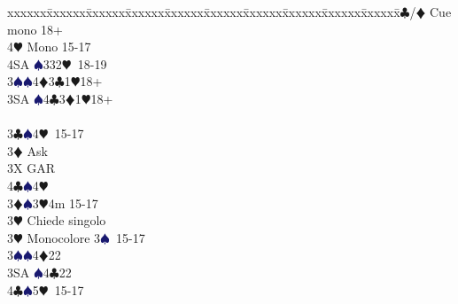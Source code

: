 \documentclass[a4paper,italian]{article}
\newcommand{\BC}{\textcolor{OliveGreen}{$\clubsuit$}}
\newcommand{\BD}{\textcolor{RedOrange}{$\vardiamondsuit$}}
\newcommand{\BH}{\textcolor{Red2}{$\varheartsuit${}}}
\newcommand{\BS}{\textcolor{MidnightBlue}{$\spadesuit${}}}
\newenvironment{bidtable}
{\begin{tabbing}

    xxxxxx\=xxxxxx\=xxxxxx\=xxxxxx\=xxxxxx\=xxxxxx\=xxxxxx\=xxxxxx\=xxxxxx\=xxxxxx\=\kill}
{\end{tabbing} }%
\begin{document}
\begin{multicols}{2}
\begin{bidtable}
                                            4\BC/\BD \> Cue mono 18+\\
                                            4\BH \> Mono 15-17\\
                                            4SA \BS 332\BH\ 18-19\-\-\\
                                            3\BS {}\BS4\BD3\BC1\BH 18+\\
                                            3SA \BS4\BC3\BD1\BH 18+\-\-\\
                                            \\
                                            3\BC {}\BS 4\BH\ 15-17\+\\
                                            3\BD \> Ask\+\\
                                            3X \> GAR\\
                                            4\BC {}\BS 4\BH \-\-\\
                                            3\BD {}\BS 3\BH 4m 15-17\+\\
                                            3\BH \> Chiede singolo\-\\
                                            3\BH \> Monocolore 3\BS\ 15-17\\
                                            3\BS {}\BS 4\BD 22\\
                                            3SA \BS 4\BC 22\\
                                            4\BC {}\BS 5\BH\ 15-17\\
                                        \end{bidtable}

\end{multicols}
\end{document}
